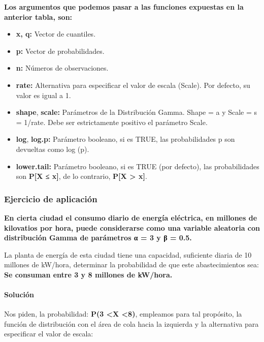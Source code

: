 \documentclass[
]{article}
\begin{document}
\textbf{Los argumentos que podemos pasar a las funciones expuestas en la
anterior tabla, son:}

\begin{itemize}
\item
  \textbf{x, q:} Vector de cuantiles.
\item
  \textbf{p:} Vector de probabilidades.
\item
  \textbf{n:} Números de observaciones.
\item
  \textbf{rate:} Alternativa para especificar el valor de escala
  (Scale). Por defecto, su valor es igual a 1.
\item
  \textbf{shape}, \textbf{scale:} Parámetros de la Distribución Gamma.
  Shape = a y Scale = s = 1/rate. Debe ser estrictamente positivo el
  parámetro Scale.
\item
  \textbf{log}, \textbf{log.p:} Parámetro booleano, si es TRUE, las
  probabilidades p son devueltas como log (p).
\item
  \textbf{lower.tail:} Parámetro booleano, si es TRUE (por defecto), las
  probabilidades son \textbf{P{[}X ≤ x{]}}, de lo contrario,
  \textbf{P{[}X \textgreater{} x{]}}.
\end{itemize}

\hypertarget{ejercicio-de-aplicaciuxf3n-1}{%
\subsubsection{Ejercicio de
aplicación}\label{ejercicio-de-aplicaciuxf3n-1}}

\textbf{En cierta ciudad el consumo diario de energía eléctrica, en
millones de kilovatios por hora, puede considerarse como una variable
aleatoria con distribución Gamma de parámetros α = 3 y β = 0.5.}

La planta de energía de esta ciudad tiene una capacidad, suficiente
diaria de 10 millones de kW/hora, determinar la probabilidad de que este
abastecimientos sea: \textbf{Se consuman entre 3 y 8 millones de
kW/hora.}

\hypertarget{soluciuxf3n-2}{%
\paragraph{Solución}\label{soluciuxf3n-2}}

Nos piden, la probabilidad: \textbf{P(3 \textless X \textless8)},
empleamos para tal propósito, la función de distribución con el área de
cola hacia la izquierda y la alternativa para especificar el valor de
escala:
\end{document}
